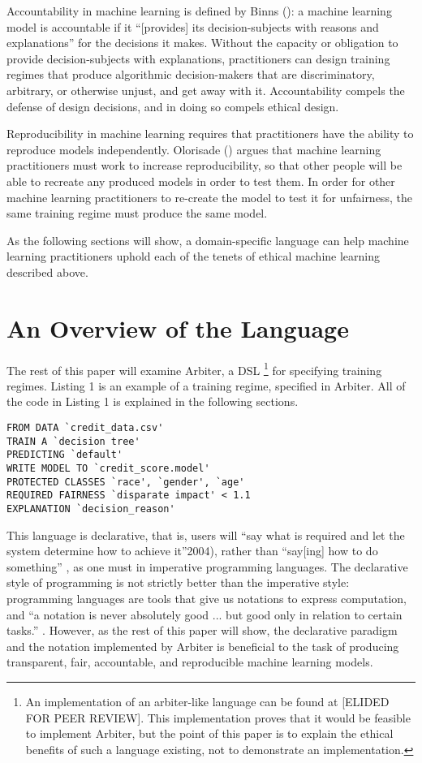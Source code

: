 \documentclass[letterpaper]{article}
\newcommand{\citep}[1]{\cite{#1}}
\begin{document}
Accountability in machine learning is defined by Binns (): a machine learning model is accountable if it ``[provides] its decision-subjects with reasons and explanations'' for the decisions it makes. Without the capacity or obligation to provide decision-subjects with explanations, practitioners can design training regimes that produce algorithmic decision-makers that are discriminatory, arbitrary, or otherwise unjust, and get away with it. Accountability compels the defense of design decisions, and in doing so compels ethical design.

Reproducibility in machine learning requires that practitioners have the ability to reproduce models independently. Olorisade () argues that machine learning practitioners must work to increase reproducibility, so that other people will be able to recreate any produced models in order to test them. In order for other machine learning practitioners to re-create the model to test it for unfairness, the same training regime must produce the same model.

As the following sections will show, a domain-specific language can help machine learning practitioners uphold each of the tenets of ethical machine learning described above.

\section{An Overview of the Language}
The rest of this paper will examine Arbiter, a DSL \footnote{An implementation of an arbiter-like language can be found at [ELIDED FOR PEER REVIEW]. This implementation proves that it would be feasible to implement Arbiter, but the point of this paper is to explain the ethical benefits of such a language existing, not to demonstrate an implementation.} for specifying training regimes. Listing 1 is an example of a training regime, specified in Arbiter. All of the code in Listing 1 is explained in the following sections.

\begin{lstlisting}[caption=Arbiter example.]
FROM DATA `credit_data.csv'
TRAIN A `decision tree'
PREDICTING `default'
WRITE MODEL TO `credit_score.model'
PROTECTED CLASSES `race', `gender', `age'
REQUIRED FAIRNESS `disparate impact' < 1.1
EXPLANATION `decision_reason'
\end{lstlisting}

This language is declarative, that is, users will ``say what is required and let the system determine how to achieve it''2004), rather than ``say[ing] how to do something'' \citep{Roy2004}, as one must in imperative programming languages. The declarative style of programming is not strictly better than the imperative style: programming languages are tools that give us notations to express computation, and ``a notation is never absolutely good ... but good only in relation to certain tasks.'' \citep{Green1989}. However, as the rest of this paper will show, the declarative paradigm and the notation implemented by Arbiter is beneficial to the task of producing transparent, fair, accountable, and reproducible machine learning models. 
\end{document}
